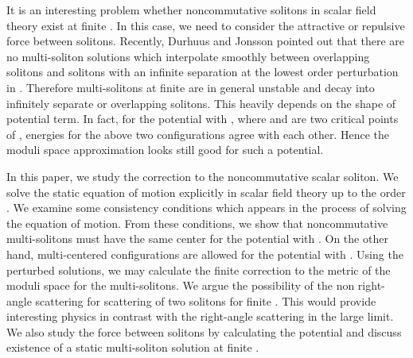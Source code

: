 \documentclass[a4paper,12pt]{article}
\begin{document}
It is an interesting problem whether noncommutative solitons in scalar field
theory exist at finite \myHighlight{$\theta$}\coordHE{}.
In this case, we need to consider the attractive or repulsive force
between solitons.
Recently, Durhuus and Jonsson pointed out that there are no
multi-soliton solutions which interpolate smoothly between \coordHE{}
overlapping solitons and \coordHE{} solitons with an infinite separation
at the lowest order perturbation in \coordHE{}\cite{DJ}.
Therefore multi-solitons at finite \myHighlight{$\theta$}\coordHE{} are in general unstable and
decay into infinitely separate or overlapping solitons.
This  heavily depends on the shape of potential term.
In fact, for the potential \coordHE{} with
\coordHE{}, where \coordHE{} and \myHighlight{$\lambda$}\coordHE{} are two critical
points of \coordHE{}, energies for the above two configurations agree
with each other.
Hence the moduli space approximation looks still good for such a
potential.

In this paper,
we study the \myHighlight{$\theta$}\coordHE{} correction to the noncommutative scalar soliton.
We solve the static
equation
of motion explicitly in scalar field theory
up to the order
 \coordHE{}.
We examine some consistency conditions
which appears in the process of solving the equation of motion.
{}From these conditions,
we show
that  noncommutative multi-solitons must have the
same center for the potential with \coordHE{}.
On the other hand, multi-centered
configurations are allowed for the  potential with
\coordHE{}.
Using the perturbed solutions, we may calculate the finite
\myHighlight{$\theta$}\coordHE{} correction
to the metric of the moduli
space for the  multi-solitons.
We argue the possibility of the
non right-angle scattering for scattering of two solitons for finite
\myHighlight{$\theta$}\coordHE{}. This would provide interesting physics  in contrast
with the right-angle scattering in the large \myHighlight{$\theta$}\coordHE{} limit.
We also study the force between solitons by calculating the potential
and discuss existence of a static multi-soliton solution
at finite \myHighlight{$\theta$}\coordHE{}.
\end{document}
